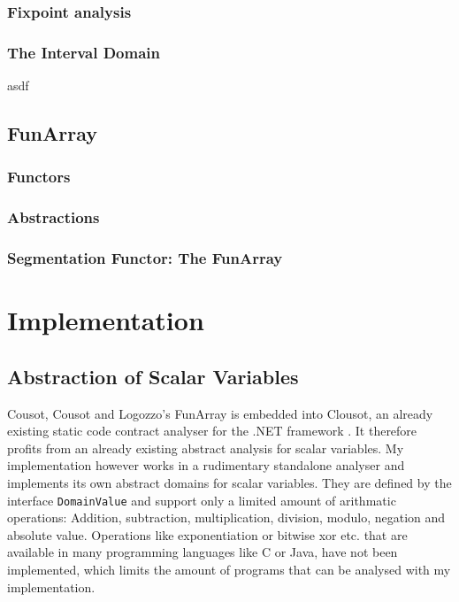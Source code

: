 \documentclass{report}
\begin{document}
\subsection{Fixpoint analysis}

\subsection{The Interval Domain}
asdf



\section{FunArray}
\subsection{Functors}
\subsection{Abstractions}
\subsection{Segmentation Functor: The FunArray}




\chapter{Implementation}



\section{Abstraction of Scalar Variables}
Cousot, Cousot and Logozzo's FunArray is embedded into Clousot, an already existing static code contract analyser for the .NET framework \cite{cousot2011}. It therefore profits from an already existing abstract analysis for scalar variables. My implementation however works in a rudimentary standalone analyser and implements its own abstract domains for scalar variables.
They are defined by the interface \texttt{DomainValue} and support only a limited amount of arithmatic operations: Addition, subtraction, multiplication, division, modulo, negation and absolute value. Operations like exponentiation or bitwise xor etc. that are available in many programming languages like C or Java, have not been implemented, which limits the amount of programs that can be analysed with my implementation. 
\end{document}
